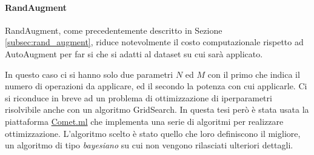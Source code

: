 \begin{table}[]
    \caption{Test dopo ulteriore fine tuning su KAIST}
    \label{table:fine_tuning_aav2_kaist}
\end{table}

\paragraph{RandAugment} 
RandAugment, come precedentemente descritto in Sezione \ref{subsec:rand_augment}, riduce notevolmente il costo computazionale rispetto ad AutoAugment per far si che si adatti al dataset su cui sarà applicato. 

In questo caso ci si hanno solo due parametri $N$ ed $M$ con il primo che indica il numero di operazioni da applicare, ed il secondo la potenza con cui applicarle. Ci si riconduce in breve ad un problema di ottimizzazione di iperparametri risolvibile anche con un algoritmo GridSearch. In questa tesi però è stata usata la piattaforma \href{http://www.comet.ml}{Comet.ml} che implementa una serie di algoritmi per realizzare ottimizzazione. L'algoritmo scelto è stato quello che loro definiscono il migliore, un algoritmo di tipo \textit{bayesiano} su cui non vengono rilasciati ulteriori dettagli.

